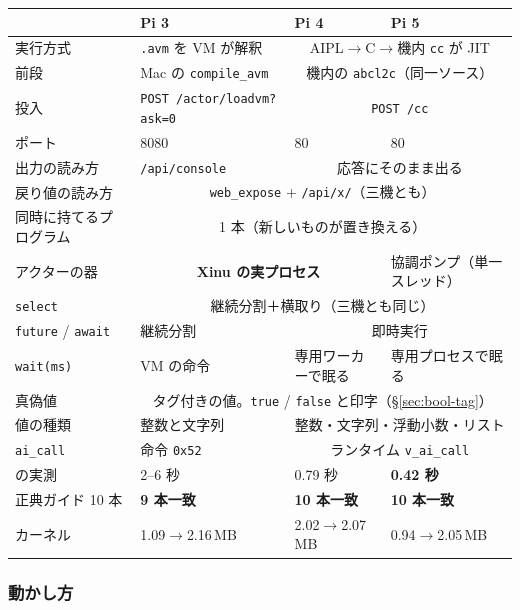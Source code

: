 \documentclass[11pt,a4paper]{ltjsarticle}
\begin{document}
\begin{center}
\small
\begin{tabular}{@{}llll@{}}
\toprule
 & Pi 3 & Pi 4 & Pi 5 \\
\midrule
実行方式 & \texttt{.avm} を VM が解釈 & \multicolumn{2}{c}{AIPL$\to$C$\to$機内 \texttt{cc} が JIT} \\
前段 & Mac の \texttt{compile\_avm} & \multicolumn{2}{c}{機内の \texttt{abcl2c}（同一ソース）} \\
投入 & \texttt{POST /actor/loadvm?ask=0} & \multicolumn{2}{c}{\texttt{POST /cc}} \\
ポート & 8080 & 80 & 80 \\
出力の読み方 & \texttt{/api/console} & \multicolumn{2}{c}{応答にそのまま出る} \\
戻り値の読み方 & \multicolumn{3}{c}{\texttt{web\_expose} + \texttt{/api/x/}（三機とも）} \\
同時に持てるプログラム & \multicolumn{3}{c}{1 本（新しいものが置き換える）} \\
アクターの器 & \multicolumn{2}{c}{\textbf{Xinu の実プロセス}} & 協調ポンプ（単一スレッド） \\
\texttt{select} & \multicolumn{3}{c}{継続分割＋横取り（三機とも同じ）} \\
\texttt{future} / \texttt{await} & 継続分割 & \multicolumn{2}{c}{即時実行} \quad（いずれも並行ではない） \\
\texttt{wait(ms)} & VM の命令 & 専用ワーカーで眠る & 専用プロセスで眠る \\
真偽値 & \multicolumn{3}{c}{タグ付きの値。\texttt{true} / \texttt{false} と印字（\S\ref{sec:bool-tag}）} \\
値の種類 & 整数と文字列 & \multicolumn{2}{c}{整数・文字列・浮動小数・リスト} \\
\texttt{ai\_call} & 命令 \texttt{0x52} & \multicolumn{2}{c}{ランタイム \texttt{v\_ai\_call}} \\
\quad の実測 & 2--6 秒 & 0.79 秒 & \textbf{0.42 秒} \\
正典ガイド 10 本 & \textbf{9 本一致} & \textbf{10 本一致} & \textbf{10 本一致} \\
カーネル & 1.09$\to$2.16\,MB & 2.02$\to$2.07\,MB & 0.94$\to$2.05\,MB \\
\bottomrule
\end{tabular}
\end{center}

\subsubsection*{動かし方}
\end{document}
